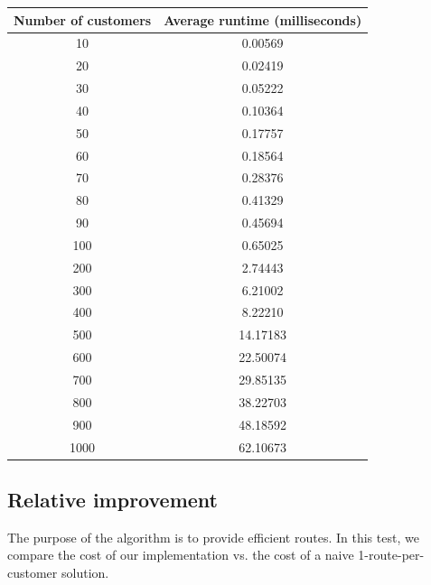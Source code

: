 \documentclass[a4paper]{article}
\begin{document}
        \begin{minipage}{\textwidth}
            \centering
            \begin{tabular}{ c c }
                Number of customers & Average runtime (milliseconds) \\
                \hline
                \hline
                10                  &  0.00569 \\
                20                  &  0.02419 \\
                30                  &  0.05222 \\
                40                  &  0.10364 \\
                50                  &  0.17757 \\
                60                  &  0.18564 \\
                70                  &  0.28376 \\
                80                  &  0.41329 \\
                90                  &  0.45694 \\
                100                 &  0.65025 \\
                200                 &  2.74443 \\
                300                 &  6.21002 \\
                400                 &  8.22210 \\
                500                 & 14.17183 \\
                600                 & 22.50074 \\
                700                 & 29.85135 \\
                800                 & 38.22703 \\
                900                 & 48.18592 \\
                1000                & 62.10673 \\
                \hline
            \end{tabular}
        \end{minipage}
        
        \subsection{Relative improvement}
        The purpose of the algorithm is to provide efficient routes. In this test, we compare the cost of our implementation vs. the cost of a naive
        1-route-per-customer solution.
        
\end{document}
